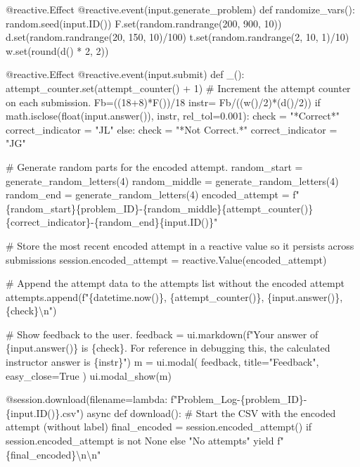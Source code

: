 \documentclass[
  letterpaper,
  DIV=11,
  numbers=noendperiod]{scrreprt}
\newenvironment{Shaded}{\begin{snugshade}}{\end{snugshade}}
\newcommand{\NormalTok}[1]{\textcolor[rgb]{0.00,0.23,0.31}{#1}}
\begin{document}
\begin{Shaded}
\begin{Highlighting}[]
\NormalTok{    @reactive.Effect}
\NormalTok{    @reactive.event(input.generate\_problem)}
\NormalTok{    def randomize\_vars():}
\NormalTok{        random.seed(input.ID())}
\NormalTok{        F.set(random.randrange(200, 900, 10))}
\NormalTok{        d.set(random.randrange(20, 150, 10)/100)}
\NormalTok{        t.set(random.randrange(2, 10, 1)/10)}
\NormalTok{        w.set(round(d() * 2, 2))}
        

\NormalTok{    @reactive.Effect}
\NormalTok{    @reactive.event(input.submit)}
\NormalTok{    def \_():}
\NormalTok{        attempt\_counter.set(attempt\_counter() + 1)  \# Increment the attempt counter on each submission.}
\NormalTok{        Fb=((18+8)*F())/18}
\NormalTok{        instr= Fb/((w()/2)*(d()/2))}
\NormalTok{        if math.isclose(float(input.answer()), instr, rel\_tol=0.001):}
\NormalTok{            check = "*Correct*"}
\NormalTok{            correct\_indicator = "JL"}
\NormalTok{        else:}
\NormalTok{            check = "*Not Correct.*"}
\NormalTok{            correct\_indicator = "JG"}

\NormalTok{        \# Generate random parts for the encoded attempt.}
\NormalTok{        random\_start = generate\_random\_letters(4)}
\NormalTok{        random\_middle = generate\_random\_letters(4)}
\NormalTok{        random\_end = generate\_random\_letters(4)}
\NormalTok{        encoded\_attempt = f"\{random\_start\}\{problem\_ID\}{-}\{random\_middle\}\{attempt\_counter()\}\{correct\_indicator\}{-}\{random\_end\}\{input.ID()\}"}

\NormalTok{        \# Store the most recent encoded attempt in a reactive value so it persists across submissions}
\NormalTok{        session.encoded\_attempt = reactive.Value(encoded\_attempt)}

\NormalTok{        \# Append the attempt data to the attempts list without the encoded attempt}
\NormalTok{        attempts.append(f"\{datetime.now()\}, \{attempt\_counter()\}, \{input.answer()\}, \{check\}\textbackslash{}n")}

\NormalTok{        \# Show feedback to the user.}
\NormalTok{        feedback = ui.markdown(f"Your answer of \{input.answer()\} is \{check\}. For reference in debugging this, the calculated instructor answer is \{instr\}")}
\NormalTok{        m = ui.modal(}
\NormalTok{            feedback,}
\NormalTok{            title="Feedback",}
\NormalTok{            easy\_close=True}
\NormalTok{        )}
\NormalTok{        ui.modal\_show(m)}

\NormalTok{    @session.download(filename=lambda: f"Problem\_Log{-}\{problem\_ID\}{-}\{input.ID()\}.csv")}
\NormalTok{    async def download():}
\NormalTok{        \# Start the CSV with the encoded attempt (without label)}
\NormalTok{        final\_encoded = session.encoded\_attempt() if session.encoded\_attempt is not None else "No attempts"}
\NormalTok{        yield f"\{final\_encoded\}\textbackslash{}n\textbackslash{}n"}
        

\end{Highlighting}
\end{Shaded}
\end{document}
